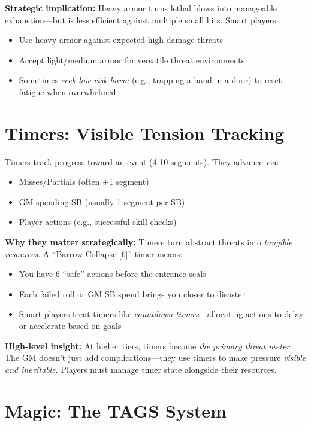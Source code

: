 \documentclass[11pt]{article}
\begin{document}
\textbf{Strategic implication:} Heavy armor turns lethal blows into manageable exhaustion---but is less efficient against multiple small hits. Smart players:
\begin{itemize}
    \item Use heavy armor against expected high-damage threats
    \item Accept light/medium armor for versatile threat environments
    \item Sometimes \textit{seek low-risk harm} (e.g., trapping a hand in a door) to reset fatigue when overwhelmed
\end{itemize}

\section{Timers: Visible Tension Tracking}

Timers track progress toward an event (4-10 segments). They advance via:
\begin{itemize}
    \item Misses/Partials (often +1 segment)
    \item GM spending SB (usually 1 segment per SB)
    \item Player actions (e.g., successful skill checks)
\end{itemize}

\textbf{Why they matter strategically:} Timers turn abstract threats into \textit{tangible resources}. A ``Barrow Collapse [6]'' timer means:
\begin{itemize}
    \item You have 6 ``safe'' actions before the entrance seals
    \item Each failed roll or GM SB spend brings you closer to disaster
    \item Smart players treat timers like \textit{countdown timers}---allocating actions to delay or accelerate based on goals
\end{itemize}

\textbf{High-level insight:} At higher tiers, timers become \textit{the primary threat meter}. The GM doesn't just add complications---they use timers to make pressure \textit{visible and inevitable}. Players must manage timer state alongside their resources.

\section{Magic: The TAGS System}
\end{document}
